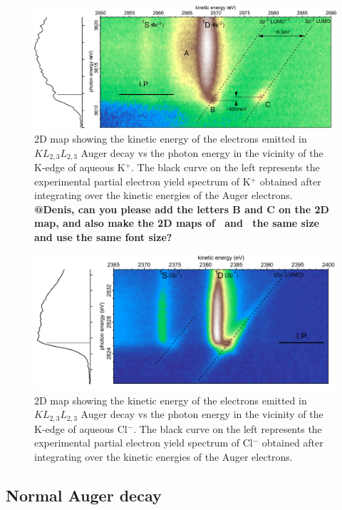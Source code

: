 \begin{figure}%
\centering
\includegraphics[scale=0.55]{figures/2Dmap_K1s_XAS.pdf}
\caption{2D map showing the kinetic energy of the electrons emitted in $K L_{2,3}L_{2,3}$ Auger decay vs the photon energy in the vicinity of the K-edge of aqueous K$^{+}$. The black curve on the left represents the experimental partial electron yield spectrum of K$^{+}$ obtained after integrating over the kinetic energies of the Auger electrons.\\
{\color{red}\bf @Denis, can you please add the letters B and C on the 2D map, and also make the 2D maps of \ki~and \cli~the same size and use the same font size?}}
\label{fg:2dmap_k}
\end{figure}


\begin{figure}%
\centering
\includegraphics[scale=0.65]{figures/2Dmap_Cl1s_XAS.pdf}
\caption{2D map showing the kinetic energy of the electrons emitted in $K L_{2,3}L_{2,3}$ Auger decay vs the photon energy in the vicinity of the K-edge of aqueous Cl$^{-}$. The black curve on the left represents the experimental partial electron yield spectrum of Cl$^{-}$ obtained after integrating over the kinetic energies of the Auger electrons.}
\label{fg:2dmap_cl}
\end{figure}


\subsection{Normal Auger decay}\label{ssec:na}

